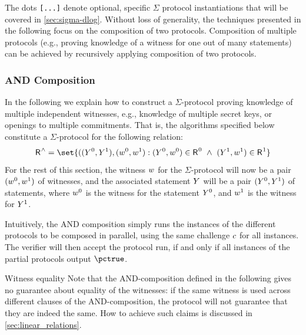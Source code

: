 \documentclass[11pt]{article}
\begin{document}
The dots \texttt{[...]} denote optional, specific $\Sigma$ protocol instantiations that will be covered in \cref{sec:sigma-dlog}.
  Without loss of generality, the techniques presented in the following focus on the composition of two protocols. 
  Composition of multiple protocols (e.g., proving knowledge of a witness for one out of many statements) can be achieved by recursively applying composition of two protocols.

  \subsubsection{AND Composition}
  In the following we explain how to construct a $\Sigma$-protocol proving knowledge of multiple independent witnesses, e.g., knowledge of multiple secret keys, or openings to multiple commitments.
  That is, the algorithms specified below constitute a $\Sigma$-protocol for the following relation:
\[
  \relation^\land = \set{
    ((\statement^0,\statement^1),(\witness^0,\witness^1) : (\statement^0,\witness^0)\in \relation^0 ~\land~ (\statement^1,\witness^1)\in\relation^1}
\]
For the rest of this section, the witness $w$ for the $\Sigma$-protocol will now be a pair $(w^0, w^1)$ of witnesses, and the associated statement $Y$ will be a pair $(Y^0, Y^1)$ of statements, where $w^0$ is the witness for the statement $Y^0$, and $w^1$ is the witness for $Y^1$.

  Intuitively, the AND composition simply runs the instances of the different protocols to be composed in parallel, using the same challenge $c$ for all instances.
  The verifier will then accept the protocol run, if and only if all instances of the partial protocols output $\accept$.
  \begin{remark}{Witness equality}{}
  Note that the AND-composition defined in the following gives no guarantee about equality of the witnesses: if the same witness is used across different clauses of the AND-composition, the protocol will not guarantee that they are indeed the same.
	How to achieve such claims is discussed in \cref{sec:linear_relations}.
  \end{remark}
\end{document}
